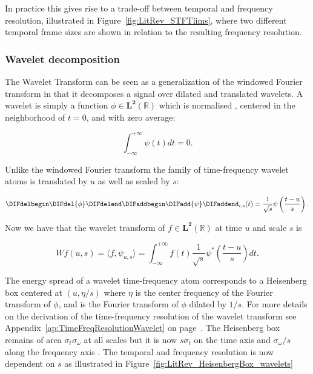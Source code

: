 In practice this gives rise to a trade-off between temporal and frequency resolution, illustrated in Figure~\ref{fig:LitRev_STFTlims}, where two different temporal frame sizes are shown in relation to the resulting frequency resolution.

\subsubsection{Wavelet decomposition}
The Wavelet Transform can be seen as a generalization of the windowed Fourier transform in that it decomposes a signal over dilated and translated wavelets. A wavelet is simply a function $\phi \in \mathbf{L^2}(\mathbb{R})$ which is normalised \DIFdelbegin {}\DIFdelend \DIFaddbegin {}\DIFaddend , centered in the neighborhood of $t=0$, and with zero average:

\begin{equation}\label{eq:Mallat1999_4}
\int^{+\infty}_{-\infty} \psi(t) dt = 0.
\end{equation}

Unlike the windowed Fourier transform the family of time-frequency wavelet atoms is translated by $u$ as well as scaled by $s$:

\begin{equation}\label{eq:Mallat1999_5}
\DIFdelbegin \DIFdel{\phi}\DIFdelend \DIFaddbegin \DIFadd{\psi}\DIFaddend _{i,s}(t) = \frac{1}{\sqrt{s}}\psi\left(\frac{t-u}{s}\right).
\end{equation}

Now we have that the wavelet transform of $f \in \mathbf{L^2}(\mathbb{R})$ at time $u$ and scale $s$ is

\begin{equation}\label{eq:Mallat1999_x}
W f(u,s) = \langle f, \psi_{u,s} \rangle = \int^{+\infty}_{-\infty} f(t) \frac{1}{\sqrt{s}}\psi^\ast \left( \frac{t-u}{s} \right) dt.
\end{equation}

The energy spread of a wavelet time-frequency atom \DIFdelbegin {}\DIFdelend \DIFaddbegin {}\DIFaddend corresponds to a Heisenberg box centered at $(u,\eta/s)$ where $\eta$ is the center frequency of \DIFdelbegin \DIFdel{$\hat{\phi}$ }\DIFdelend \DIFaddbegin \DIFadd{$\hat{\psi}$ }\DIFaddend the Fourier transform of $\phi$, and \DIFdelbegin {}\DIFdelend \DIFaddbegin {}\DIFaddend is the Fourier transform of $\phi$ dilated by $1/s$. For more details on the derivation of the time-frequency resolution of the wavelet transform see Appendix~\ref{ap:TimeFreqResolutionWavelet} on page~\pageref{ap:TimeFreqResolutionWavelet}. The Heisenberg box remains of area $\sigma_t \sigma_\omega$ at all scales but it is now $s\sigma_t$ on the time axis and $\sigma_\omega /s$ along the frequency axis \cite{Mallat1999}. The temporal and frequency resolution is now dependent on $s$ as illustrated in Figure~\ref{fig:LitRev_HeisenbergBox_wavelets}

